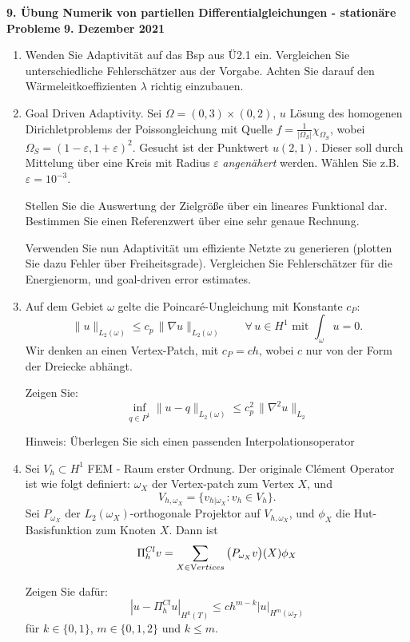 \documentclass[11pt,a4paper]{report}
\begin{document}
\begin{center}
\textbf{9. \"Ubung Numerik von partiellen Differentialgleichungen - station\"are Probleme} \newline 
\textbf{9. Dezember 2021}
\end{center}

\setcounter{enumi}{4}

\begin{enumerate}

\item Wenden Sie Adaptivit\"at auf das Bsp aus \"U2.1
  ein. Vergleichen Sie unterschiedliche Fehlersch\"atzer aus der
  Vorgabe. Achten Sie darauf den W\"armeleitkoeffizienten $\lambda$
  richtig einzubauen.


 \item Goal Driven Adaptivity. Sei $\Omega = (0,3) \times (0,2)$, $u$
   L\"osung des homogenen Dirichletproblems der Poissongleichung
   mit Quelle $f = \tfrac{1}{|\Omega_S|}   \chi_{\Omega_S}$, wobei $\Omega_S =
     (1-\varepsilon,1+\varepsilon)^2$.  Gesucht ist der Punktwert
     $u(2,1)$. Dieser soll durch Mittelung \"uber eine Kreis mit
     Radius $\varepsilon$ {\em angen\"ahert} werden. W\"ahlen Sie
     z.B. $\varepsilon = 10^{-3}$.

     Stellen Sie die Auswertung der Zielgr\"o\ss{}e \"uber ein lineares
     Funktional dar. Bestimmen Sie einen Referenzwert \"uber eine sehr
     genaue Rechnung.

     Verwenden Sie nun Adaptivit\"at um effiziente Netzte zu
     generieren (plotten Sie dazu Fehler \"uber Freiheitsgrade). 
     Vergleichen Sie Fehlersch\"atzer f\"ur die Energienorm, und
     goal-driven error estimates.


   \item Auf dem Gebiet $\omega$ gelte die Poincar\'e-Ungleichung mit
     Konstante $c_P$:
     $$
     \| u \|_{L_2(\omega)} \leq c_p \, \| \nabla u \|_{L_2(\omega)} \qquad
       \forall \, u \in H^1 \text{ mit } \int_\omega u = 0.
     $$
     Wir denken an einen Vertex-Patch, mit $c_P = c h$, wobei $c$ nur
     von der Form der Dreiecke abh\"angt.

     Zeigen Sie:
     $$
     \inf_{q \in P^1} \| u - q \|_{L_2(\omega)} \leq c_p^2 \, \| \nabla^2
     u \|_{L_2}
     $$

     Hinweis: \"Uberlegen Sie sich einen passenden Interpolationsoperator
   \item
     Sei $V_h \subset H^1$  FEM - Raum erster Ordnung. 
     Der originale  Cl\'ement Operator ist wie folgt definiert:
  $\omega_X$ der Vertex-patch zum Vertex $X$, und
  $$
  V_{h, \omega_X} = \{ v_{h|\omega_X} : v_h \in V_h \}.
$$
Sei $P_{\omega_X}$ der $L_2(\omega_X)$-orthogonale Projektor auf
$V_{h,\omega_X}$, und $\phi_X$ die Hut-Basisfunktion zum Knoten $X$. Dann ist
$$
\Pi_h^{Cl} v = \sum_{X \in {\text Vertices}}  \big( P_{\omega_X} v \big)
(X) \phi_X 
$$

Zeigen Sie daf\"ur:
$$
| u - \Pi_h^{Cl} u |_{H^k(T)} \leq c h^{m-k} | u |_{H^m(\omega_T)}
$$
f\"ur $k \in \{ 0,1 \}$, $m \in \{ 0, 1, 2 \}$ und $k \leq m$.

\end{enumerate}
\end{document}
